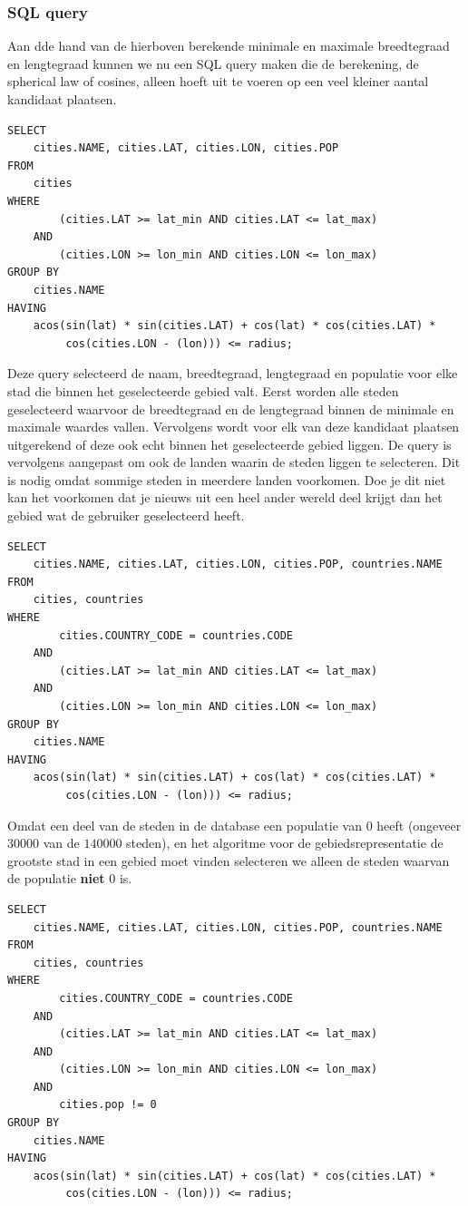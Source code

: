 \documentclass[twoside,openright]{uva-bachelor-thesis}
\begin{document}
		\subsubsection{SQL query}
		Aan dde hand van de hierboven berekende minimale en maximale breedtegraad en lengtegraad kunnen we nu een SQL query maken die de berekening, de spherical law of cosines, alleen hoeft uit te voeren op een veel kleiner aantal kandidaat plaatsen.
\begin{verbatim}
SELECT
    cities.NAME, cities.LAT, cities.LON, cities.POP
FROM 
    cities 
WHERE 
        (cities.LAT >= lat_min AND cities.LAT <= lat_max) 
    AND 
        (cities.LON >= lon_min AND cities.LON <= lon_max) 
GROUP BY
    cities.NAME
HAVING
    acos(sin(lat) * sin(cities.LAT) + cos(lat) * cos(cities.LAT) * 
         cos(cities.LON - (lon))) <= radius;
\end{verbatim}
Deze query selecteerd de naam, breedtegraad, lengtegraad en populatie voor elke stad die binnen het geselecteerde gebied valt. Eerst worden alle steden geselecteerd waarvoor de breedtegraad en de lengtegraad binnen de minimale en maximale waardes vallen. Vervolgens wordt voor elk van deze kandidaat plaatsen uitgerekend of deze ook echt binnen het geselecteerde gebied liggen. De query is vervolgens aangepast om ook de landen waarin de steden liggen te selecteren. Dit is nodig omdat sommige steden in meerdere landen voorkomen. Doe je dit niet kan het voorkomen dat je nieuws uit een heel ander wereld deel krijgt dan het gebied wat de gebruiker geselecteerd heeft.
\begin{verbatim}
SELECT
    cities.NAME, cities.LAT, cities.LON, cities.POP, countries.NAME
FROM 
    cities, countries 
WHERE
        cities.COUNTRY_CODE = countries.CODE 
    AND
        (cities.LAT >= lat_min AND cities.LAT <= lat_max) 
    AND 
        (cities.LON >= lon_min AND cities.LON <= lon_max) 
GROUP BY
    cities.NAME
HAVING
    acos(sin(lat) * sin(cities.LAT) + cos(lat) * cos(cities.LAT) * 
         cos(cities.LON - (lon))) <= radius;
\end{verbatim}
Omdat een deel van de steden in de database een populatie van $0$ heeft (ongeveer $30000$ van de $ 140000$ steden), en het algoritme voor de gebiedsrepresentatie de grootste stad in een gebied moet vinden selecteren we alleen de steden waarvan de populatie \textbf{niet} $0$ is.
\begin{verbatim}
SELECT
    cities.NAME, cities.LAT, cities.LON, cities.POP, countries.NAME
FROM 
    cities, countries 
WHERE
        cities.COUNTRY_CODE = countries.CODE 
    AND
        (cities.LAT >= lat_min AND cities.LAT <= lat_max) 
    AND 
        (cities.LON >= lon_min AND cities.LON <= lon_max)
    AND
        cities.pop != 0
GROUP BY
    cities.NAME
HAVING
    acos(sin(lat) * sin(cities.LAT) + cos(lat) * cos(cities.LAT) * 
         cos(cities.LON - (lon))) <= radius;
\end{verbatim}
\end{document}
